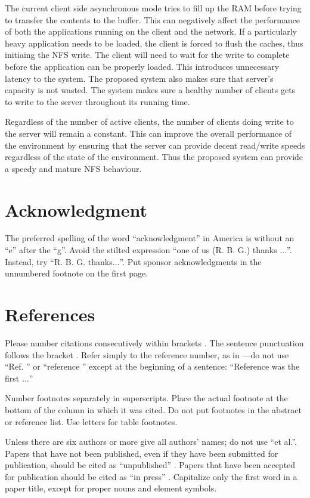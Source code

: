 \documentclass[conference]{IEEEtran}
\begin{document}
The current client side asynchronous mode tries to fill up the RAM before
trying to transfer the contents to the buffer. This can negatively affect
the performance of both the applications running on the client and the
network. If a particularly heavy application needs to be loaded, the client 
is forced to flush the caches, thus initiaing the NFS write. The client
will need to wait for the write to complete before the application can be
properly loaded. This introduces unnecessary latency to the system. The 
proposed system also makes sure that server's capacity is not wasted. The 
system makes sure a healthy number of clients gets to write to the server
throughout its running time.

Regardless of the number of active clients, the number of clients doing
write to the server will remain a constant. This can improve the overall 
performance of the environment by ensuring that the server can provide 
decent read/write speeds regardless of the state of the environment. Thus
the proposed system can provide a speedy and mature NFS behaviour.

\section*{Acknowledgment}

The preferred spelling of the word ``acknowledgment'' in America is without 
an ``e'' after the ``g''. Avoid the stilted expression ``one of us (R. B. 
G.) thanks $\ldots$''. Instead, try ``R. B. G. thanks$\ldots$''. Put sponsor 
acknowledgments in the unnumbered footnote on the first page.

\section*{References}

Please number citations consecutively within brackets \cite{b1}. The 
sentence punctuation follows the bracket \cite{b2}. Refer simply to the reference 
number, as in \cite{b3}---do not use ``Ref. \cite{b3}'' or ``reference \cite{b3}'' except at 
the beginning of a sentence: ``Reference \cite{b3} was the first $\ldots$''

Number footnotes separately in superscripts. Place the actual footnote at 
the bottom of the column in which it was cited. Do not put footnotes in the 
abstract or reference list. Use letters for table footnotes.

Unless there are six authors or more give all authors' names; do not use 
``et al.''. Papers that have not been published, even if they have been 
submitted for publication, should be cited as ``unpublished'' \cite{b4}. Papers 
that have been accepted for publication should be cited as ``in press'' \cite{b5}. 
Capitalize only the first word in a paper title, except for proper nouns and 
element symbols.
\end{document}
